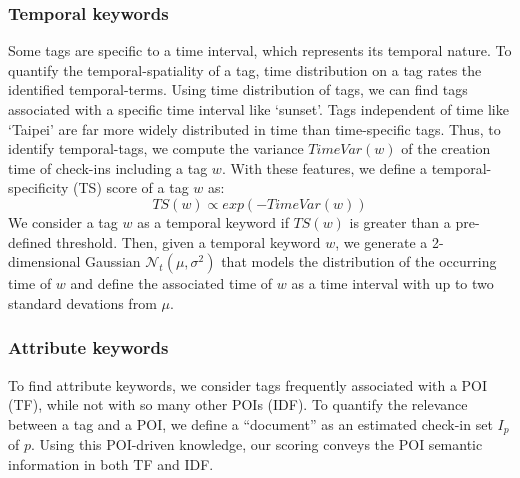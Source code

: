 \subsubsection{Temporal keywords} \label{subsec:KE.temporal}%
Some tags are specific to a time interval, which represents its temporal nature. To quantify the temporal-spatiality of a tag, time distribution on a tag rates the identified temporal-terms. Using time distribution of tags, we can find tags associated with a specific time interval like `sunset'. Tags independent of time like `Taipei' are far more widely distributed in time than time-specific tags. Thus, to identify temporal-tags, we compute the variance $TimeVar(w)$ of the creation time of check-ins including a tag $w$. With these features, we define a temporal-specificity (\textsf{TS}) score of a tag $w$ as:
\begin{equation}
TS(w) \propto exp(-TimeVar(w))
\end{equation}
We consider a tag $w$ as a temporal keyword if $TS(w)$ is greater than a pre-defined threshold. Then, given a temporal keyword $w$, we generate a 2-dimensional Gaussian $\mathcal{N}_t(\mu,\sigma^2)$ that models the distribution of the occurring time of $w$ and define the associated time of $w$ as a time interval with up to two standard devations from $\mu$.


\subsubsection{Attribute keywords} \label{subsec:KE.attribute}
To find attribute keywords, we consider tags frequently associated with a POI (TF), while not with so many other POIs (IDF). To quantify the relevance between a tag and a POI, we define a ``document'' as an estimated check-in set $I_{p}$ of $p$. Using this POI-driven knowledge, our scoring conveys the POI semantic information in both TF and IDF.

